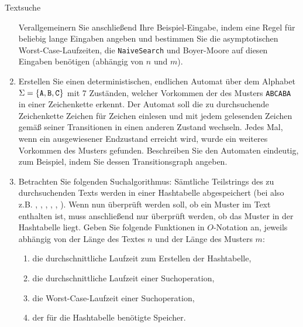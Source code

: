 \documentclass[11pt,a4paper]{article}
\begin{document}
\begin{aufgabe}{3}{Textsuche}
\begin{enumerate}[label=\alph*)]
        Verallgemeinern Sie anschließend Ihre Beispiel-Eingabe, indem eine Regel für beliebig lange  Eingaben angeben und bestimmen Sie die asymptotischen Worst-Case-Laufzeiten, die \texttt{NaiveSearch} und Boyer-Moore auf diesen Eingaben benötigen (abhängig von $n$ und $m$).

        \item Erstellen Sie einen deterministischen, endlichen Automat über dem Alphabet $\Sigma = \{\text{\texttt{A}}, \text{\texttt{B}}, \text{\texttt{C}}\}$ mit 7 Zuständen, welcher Vorkommen der des Musters \texttt{ABCABA} in einer Zeichenkette erkennt.
        Der Automat soll die zu durchsuchende Zeichenkette Zeichen für Zeichen einlesen und mit jedem gelesenden Zeichen gemäß seiner Transitionen in einen anderen Zustand wechseln.
        Jedes Mal, wenn ein ausgewiesener Endzustand erreicht wird, wurde ein weiteres Vorkommen des Musters gefunden.
        Beschreiben Sie den Automaten eindeutig, zum Beispiel, indem Sie dessen Transitionsgraph angeben.
        \item Betrachten Sie folgenden Suchalgorithmus:
        Sämtliche Teilstrings des zu durchsuchenden Texts werden in einer Hashtabelle abgespeichert (bei  also z.B. , , , , , ).
        Wenn nun überprüft werden soll, ob ein Muster im Text enthalten ist, muss anschließend nur überprüft werden, ob das Muster in der Hashtabelle liegt.
        Geben Sie folgende Funktionen in $O$-Notation an, jeweils abhängig von der Länge des Textes $n$ und der Länge des Musters $m$:
        \begin{enumerate}[label=\roman*)]
            \item die durchschnittliche Laufzeit zum Erstellen der Hashtabelle,
            \item die durchschnittliche Laufzeit einer Suchoperation,
            \item die Worst-Case-Laufzeit einer Suchoperation,
            \item der für die Hashtabelle benötigte Speicher.
        \end{enumerate}
        \begin{description}

\end{description}
\end{enumerate}
\end{aufgabe}
\end{document}

